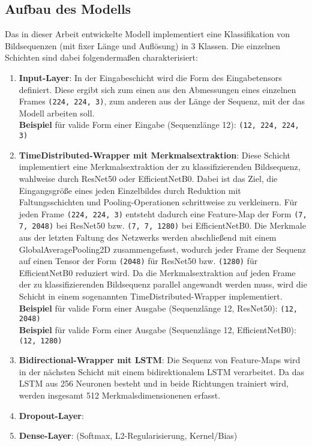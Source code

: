 \documentclass{article}
\newcommand{\imgsize}{\texttt{(224, 224, 3)}\xspace}
\newcommand{\resnet}{ResNet50\xspace}
\newcommand{\effnet}{EfficientNetB0\xspace}
\begin{document}
    \subsection{Aufbau des Modells}
    Das in dieser Arbeit entwickelte Modell implementiert eine Klassifikation von Bildsequenzen (mit fixer Länge und Auflösung) in 3 Klassen.
    Die einzelnen Schichten sind dabei folgendermaßen charakterisiert:
    \begin{enumerate}
        \item\textbf{Input-Layer}:
            In der Eingabeschicht wird die Form des Eingabetensors definiert.
            Diese ergibt sich zum einen aus den Abmessungen eines einzelnen Frames \imgsize, zum anderen aus der Länge der Sequenz, mit der das Modell arbeiten soll.
            \\\textbf{Beispiel} für valide Form einer Eingabe (Sequenzlänge 12): \texttt{(12, 224, 224, 3)}
        \item\textbf{TimeDistributed-Wrapper mit Merkmalsextraktion}:
            Diese Schicht implementiert eine Merkmalsextraktion der zu klassifizierenden Bildsequenz, wahlweise durch \resnet oder \effnet.
            Dabei ist das Ziel, die Eingangsgröße eines jeden Einzelbildes durch Reduktion mit Faltungsschichten und Pooling-Operationen schrittweise zu verkleinern.
            Für jeden Frame \imgsize entsteht dadurch eine Feature-Map der Form \texttt{(7, 7, 2048)} bei \resnet bzw. \texttt{(7, 7, 1280)} bei \effnet.
            Die Merkmale aus der letzten Faltung des Netzwerks werden abschließend mit einem GlobalAveragePooling2D zusammengefasst, wodurch jeder Frame der Sequenz auf einen Tensor der Form \texttt{(2048)} für \resnet bzw. \texttt{(1280)} für \effnet reduziert wird.
            Da die Merkmalsextraktion auf jeden Frame der zu klassifizierenden Bildsequenz parallel angewandt werden muss, wird die Schicht in einem sogenannten TimeDistributed-Wrapper implementiert.
            \\\textbf{Beispiel} für valide Form einer Ausgabe (Sequenzlänge 12, \resnet): \texttt{(12, 2048)}
            \\\textbf{Beispiel} für valide Form einer Ausgabe (Sequenzlänge 12, \effnet): \texttt{(12, 1280)}
        \item\textbf{Bidirectional-Wrapper mit LSTM}:
            Die Sequenz von Feature-Maps wird in der nächsten Schicht mit einem bidirektionalem LSTM verarbeitet.
            Da das LSTM aus 256 Neuronen besteht und in beide Richtungen trainiert wird, werden insgesamt 512 Merkmalsdimensionenen erfasst.

        \item\textbf{Dropout-Layer}: 
        \item\textbf{Dense-Layer}: (Softmax, L2-Regularisierung, Kernel/Bias)
    \end{enumerate}
\end{document}
